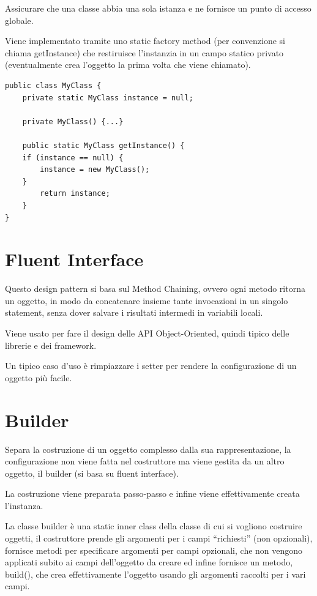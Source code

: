 Assicurare che una classe abbia una sola istanza e ne fornisce un punto di accesso globale.

Viene implementato tramite uno static factory method (per convenzione si chiama getInstance) che restiruisce l'instanzia in un campo statico privato 
(eventualmente crea l'oggetto la prima volta che viene chiamato).

\begin{lstlisting}
public class MyClass {
    private static MyClass instance = null;
    
    private MyClass() {...}

    public static MyClass getInstance() {
    if (instance == null) {
        instance = new MyClass();
    }
        return instance;
    }
}
\end{lstlisting}

\section{Fluent Interface}

Questo design pattern si basa sul Method Chaining, ovvero ogni metodo ritorna un oggetto, in modo da concatenare insieme tante invocazioni in un singolo statement, 
senza dover salvare i risultati intermedi in variabili locali.

Viene usato per fare il design delle API Object-Oriented, quindi tipico delle librerie e dei framework.

Un tipico caso d’uso è rimpiazzare i setter per rendere la configurazione di un oggetto più facile.

\section{Builder}

Separa la costruzione di un oggetto complesso dalla sua rappresentazione, la configurazione non viene fatta nel costruttore ma viene gestita da un altro oggetto, 
il builder (si basa su fluent interface).

La costruzione viene preparata passo-passo e infine viene effettivamente creata l’instanza.

La classe builder è una static inner class della classe di cui si vogliono costruire oggetti, il costruttore prende gli argomenti per i campi “richiesti” 
(non opzionali), fornisce metodi per specificare argomenti per campi opzionali, che non vengono applicati subito ai campi dell’oggetto da creare ed infine fornisce un 
metodo, build(), che crea effettivamente l’oggetto usando gli argomenti raccolti per i vari campi.

